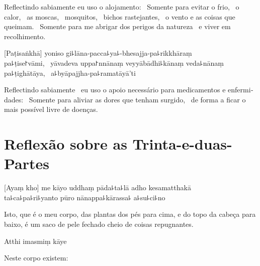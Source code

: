 \begin{english}
  Reflectindo sabiamente eu uso o alojamento: \pause\ Somente para evitar o
  frio, \pause\ o calor, \pause\ as moscas, \pause\ mosquitos, \pause\ bichos
  rastejantes, \pause\ o vento e as coisas que queimam. \pause\ Somente para me
  abrigar dos perigos da natureza \pause\ e viver em recolhimento.
\end{english}

[Paṭisaṅkhā] yoniso gi꜕lāna-pacca꜕ya꜕-bhesajja-pa꜕rikkhāraṃ\\
pa꜕ṭise꜓vāmi, \pause\ yāvadeva uppa꜓nnānaṃ veyyābādhi꜕kānaṃ veda꜕nānaṃ
pa꜕ṭighātāya, \pause\ a꜕byāpajjha-pa꜕ramatāyā'ti

\begin{english}
  Reflectindo sabiamente \pause\ eu uso o apoio necessário para medicamentos e
  enfermidades: \pause\ Somente para aliviar as dores que tenham surgido,
  \pause\ de forma a ficar o mais possível livre de doenças.
\end{english}

\chapter[Trinta-e-duas-Partes]{Reflexão sobre as Trinta-e-duas-Partes}


\begin{leader}
\end{leader}

[Ayaṃ kho] me kāyo uddhaṃ pāda꜕ta꜕lā adho kesamatthakā\\
ta꜕ca꜕pa꜕ri꜕yanto pūro nānappa꜕kārassa꜕ a꜕su꜕ci꜕no

\begin{english}
  Isto, que é o meu corpo, das plantas dos pés para cima, e do topo da cabeça para baixo, é um saco de pele fechado cheio de coisas repugnantes.
\end{english}

Atthi imasmiṃ kāye

\begin{english}
  Neste corpo existem:
\end{english}


